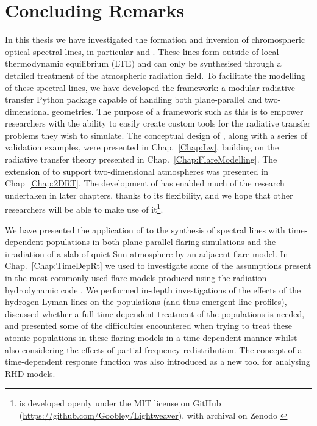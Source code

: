 \chapter{Concluding Remarks}

In this thesis we have investigated the formation and inversion of chromospheric optical spectral lines, in particular \Ha{} and \CaLine{}.
These lines form outside of local thermodynamic equilibrium (LTE) and can only be synthesised through a detailed treatment of the atmospheric radiation field.
To facilitate the modelling of these spectral lines, we have developed the \Lw{} framework: a modular radiative transfer Python package capable of handling both plane-parallel and two-dimensional geometries.
The purpose of a framework such as this is to empower researchers with the ability to easily create custom tools for the radiative transfer problems they wish to simulate.
The conceptual design of \Lw{}, along with a series of validation examples, were presented in Chap.~\ref{Chap:Lw}, building on the radiative transfer theory presented in Chap.~\ref{Chap:FlareModelling}.
The extension of \Lw{} to support two-dimensional atmospheres was presented in Chap~\ref{Chap:2DRT}.
The development of \Lw{} has enabled much of the research undertaken in later chapters, thanks to its flexibility, and we hope that other researchers will be able to make use of it\footnote{\Lw{} \citep{Osborne2021} is developed openly under the MIT license on GitHub (\url{https://github.com/Goobley/Lightweaver}), with archival on Zenodo \citep{LightweaverZenodo}}.

We have presented the application of \Lw{} to the synthesis of spectral lines with time-dependent populations in both plane-parallel flaring simulations and the irradiation of a slab of quiet Sun atmosphere by an adjacent flare model.
In Chap.~\ref{Chap:TimeDepRt} we used \Lw{} to investigate some of the assumptions present in the most commonly used flare models produced using the \Sota{} radiation hydrodynamic code \Radyn{}.
We performed in-depth investigations of the effects of the hydrogen Lyman lines on the \Caii{} populations (and thus emergent line profiles), discussed whether a full time-dependent treatment of the \Caii{} populations is needed, and presented some of the difficulties encountered when trying to treat these atomic populations in these flaring models in a time-dependent manner whilst also considering the effects of partial frequency redistribution.
The concept of a time-dependent response function was also introduced as a new tool for analysing RHD models.

